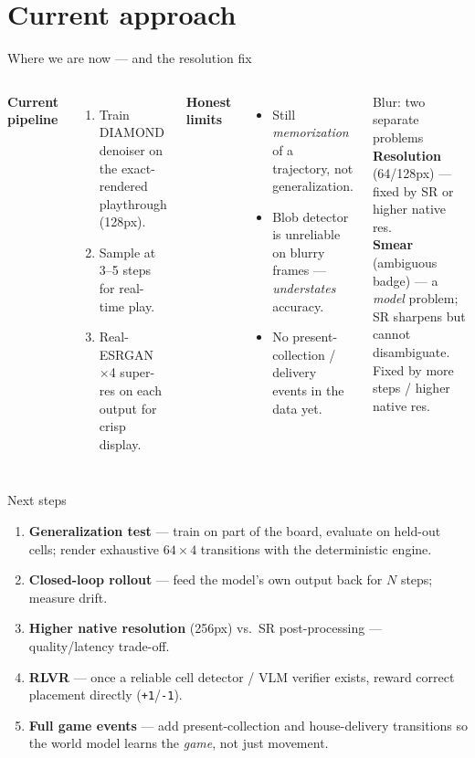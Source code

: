 \documentclass[aspectratio=169,11pt]{beamer}
\newcommand{\code}[1]{\texttt{\small #1}}
\begin{document}
\section{Current approach}
\begin{frame}{Where we are now --- and the resolution fix}
  \begin{columns}[T]
      \textbf{Current pipeline}
      \begin{enumerate}
        \item Train DIAMOND denoiser on the exact-rendered playthrough (128px).
        \item Sample at 3--5 steps for real-time play.
        \item \alert{Real-ESRGAN $\times$4} super-res on each output for crisp display.
      \end{enumerate}
      \vspace{0.5em}
      \textbf{Honest limits}
      \begin{itemize}
        \item Still \emph{memorization} of a trajectory, not generalization.
        \item Blob detector is unreliable on blurry frames --- \emph{understates} accuracy.
        \item No present-collection / delivery events in the data yet.
      \end{itemize}
      \begin{block}{Blur: two separate problems}
        \footnotesize
        \textbf{Resolution} (64/128px) --- fixed by SR or higher native res.\\[0.4em]
        \textbf{Smear} (ambiguous badge) --- a \emph{model} problem; SR sharpens
        but cannot disambiguate. Fixed by more steps / higher native res.
      \end{block}
  \end{columns}
\end{frame}

\begin{frame}{Next steps}
  \begin{enumerate}
    \item \textbf{Generalization test} --- train on part of the board, evaluate on
          held-out cells; render exhaustive $64\!\times\!4$ transitions with the
          deterministic engine.
    \item \textbf{Closed-loop rollout} --- feed the model's own output back for
          $N$ steps; measure drift.
    \item \textbf{Higher native resolution} (256px) vs.\ SR post-processing ---
          quality/latency trade-off.
    \item \textbf{RLVR} --- once a reliable cell detector / VLM verifier exists,
          reward correct placement directly (\code{+1}/\code{-1}).
    \item \textbf{Full game events} --- add present-collection and house-delivery
          transitions so the world model learns the \emph{game}, not just movement.
  \end{enumerate}
\end{frame}
\end{document}
